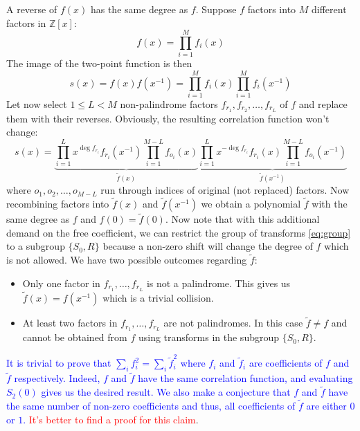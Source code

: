 \documentclass[12pt, a4paper]{article}
\begin{document}
A reverse of $f(x)$ has the same degree as $f$. Suppose $f$ factors into $M$
different factors in $\mathbb{Z}[x]$:
\begin{equation*}
  f(x) = \prod_{i=1}^M f_i(x)
\end{equation*}
The image of the two-point function is then
\begin{equation*}
  s(x) = f(x)f(x^{-1}) = \prod_{i=1}^M f_i(x) \prod_{i=1}^M f_i(x^{-1})
\end{equation*}
Let now select $1 \le L < M$ non-palindrome factors
$f_{r_1}, f_{r_2}, \dots, f_{r_L}$ of $f$ and replace them with their
reverses. Obviously, the resulting correlation function won't change:
\begin{equation*}
  s(x) = \underbrace{\prod_{i=1}^L x^{\deg f_{r_i}} f_{r_i}(x^{-1}) \prod_{i=1}^{M-L} f_{o_i}(x)}_{\tilde{f}(x)}
  \underbrace{\prod_{i=1}^L x^{-\deg f_{r_i}} f_{r_i}(x) \prod_{i=1}^{M-L} f_{o_i}(x^{-1})}_{\tilde{f}(x^{-1})}
\end{equation*}
where $o_1, o_2, \dots, o_{M-L}$ run through indices of original (not replaced)
factors. Now recombining factors into $\tilde{f}(x)$ and $\tilde{f}(x^{-1})$ we
obtain a polynomial $\tilde{f}$ with the same degree as $f$ and $f(0) = \tilde{f}(0)$.
Now note that with this additional demand on the free coefficient, we can
restrict the group of transforms \cref{eq:group} to a subgroup $\{S_0, R\}$
because a non-zero shift will change the degree of $f$ which is not allowed. We
have two possible outcomes regarding $\tilde{f}$:
\begin{itemize}
\item Only one factor in $f_{r_1}, \dots, f_{r_L}$ is not a palindrome. This
  gives us $\tilde{f}(x) = f(x^{-1})$ which is a trivial collision.
\item At least two factors in $f_{r_1}, \dots, f_{r_L}$ are not palindromes. In
  this case $\tilde{f} \ne f$ and cannot be obtained from $f$ using transforms
  in the subgroup $\{S_0, R\}$.
\end{itemize}

\textcolor{blue}{It is trivial to prove that $\sum_if_i^2 = \sum_i\tilde{f}_i^2$
  where $f_i$ and $\tilde{f}_i$ are coefficients of $f$ and $\tilde{f}$
  respectively. Indeed, $f$ and $\tilde{f}$ have the same correlation function,
  and evaluating $S_2(0)$ gives us the desired result. We also make a conjecture
  that $f$ and $\tilde{f}$ have the same number of non-zero coefficients and
  thus, all coefficients of $\tilde{f}$ are either $0$ or $1$.}
\textcolor{red}{It's better to find a proof for this claim}.
\end{document}
